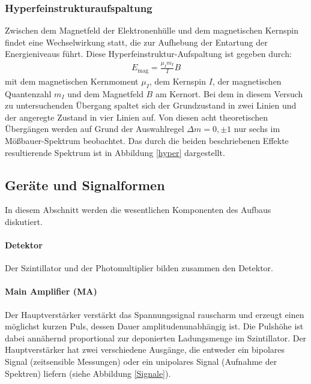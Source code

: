 \subsubsection{Hyperfeinstrukturaufspaltung}\label{hyperfein}

Zwischen dem Magnetfeld der Elektronenhülle und dem magnetischen Kernspin findet eine Wechselwirkung statt, die zur Aufhebung der Entartung der Energieniveaus führt. Diese Hyperfeinstruktur-Aufspaltung 
ist gegeben durch:
\begin{align}
E_\text{mag} = \frac{\mu_I m_I}{I}B\label{eq:hyperfein}
\end{align}
mit dem magnetischen Kernmoment $\mu_I$, dem Kernspin $I$, der magnetischen Quantenzahl $m_I$ und dem Magnetfeld $B$ am Kernort.
Bei dem in diesem Versuch zu untersuchenden Übergang spaltet sich der Grundzustand in zwei Linien und der angeregte Zustand in vier Linien auf. Von diesen acht theoretischen Übergängen werden auf Grund der Auswahlregel $\Delta m =0, \pm 1$ nur sechs im Mößbauer-Spektrum beobachtet. Das durch die beiden beschriebenen Effekte resultierende Spektrum ist in Abbildung \ref{hyper} dargestellt.


\newpage
\subsection{Geräte und Signalformen}
In diesem Abschnitt werden die wesentlichen Komponenten des Aufbaus diskutiert. \cite{szinti}
\paragraph{Detektor} Der Szintillator und der Photomultiplier bilden zusammen den Detektor.
\paragraph{Main Amplifier (MA)}
Der Hauptverstärker  verstärkt das Spannungssignal rauscharm und erzeugt einen möglichst kurzen Puls, dessen Dauer amplitudenunabhängig ist. Die Pulshöhe ist dabei annähernd proportional zur deponierten Ladungsmenge im Szintillator. Der Hauptverstärker hat zwei verschiedene Ausgänge, die entweder ein bipolares Signal (zeitsensible Messungen) oder ein unipolares Signal (Aufnahme der Spektren) liefern (siehe Abbildung \ref{Signale}).
